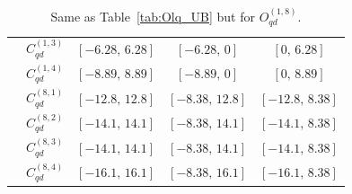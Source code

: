 \begin{table}[htbp]
{\begin{tabular}{ccccc}
        & $C_{qd}^{(1,3)}$ & $[-6.28,\, 6.28]$ & $[-6.28,\, 0]$    & $[0,\, 6.28]$    \\
        & $C_{qd}^{(1,4)}$ & $[-8.89,\, 8.89]$ & $[-8.89,\, 0]$    & $[0,\, 8.89]$    \\
        & $C_{qd}^{(8,1)}$ & $[-12.8,\, 12.8]$ & $[-8.38,\, 12.8]$ & $[-12.8,\, 8.38]$ \\
        & $C_{qd}^{(8,2)}$ & $[-14.1,\, 14.1]$ & $[-8.38,\, 14.1]$ & $[-14.1,\, 8.38]$ \\
        & $C_{qd}^{(8,3)}$ & $[-14.1,\, 14.1]$ & $[-8.38,\, 14.1]$ & $[-14.1,\, 8.38]$ \\
        & $C_{qd}^{(8,4)}$ & $[-16.1,\, 16.1]$ & $[-8.38,\, 16.1]$ & $[-16.1,\, 8.38]$ \\
    \bottomrule
\end{tabular}}
\caption{Same as Table~\ref{tab:Olq_UB} but for $O_{qd}^{(1,8)}$.}
\label{tab:Oqd_UB}
\end{table}